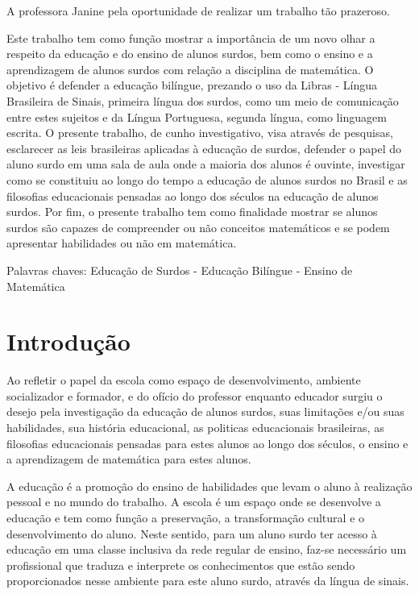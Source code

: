 \documentclass[brasil]{abnt}
\begin{document}
	A professora Janine pela oportunidade de realizar um trabalho tão prazeroso.

\begin{resumo}
	Este trabalho tem como função mostrar a importância de um novo olhar a respeito da educação e do ensino de alunos surdos, bem como o ensino e a aprendizagem de alunos surdos com
	relação a disciplina de matemática. O objetivo é defender a educação bilíngue, prezando o uso da Libras - Língua Brasileira de Sinais, primeira língua dos surdos, como um meio de comunicação entre estes sujeitos 
	e da Língua Portuguesa, segunda língua, como linguagem escrita. O presente trabalho, de cunho investigativo, visa através de pesquisas, esclarecer as leis brasileiras aplicadas à 
	educação  de surdos, defender o papel do aluno surdo em uma sala de aula onde a maioria dos alunos é ouvinte, investigar como se constituiu ao longo do tempo a educação de alunos 
	surdos no Brasil e as filosofias educacionais pensadas ao longo dos séculos na educação de alunos surdos. Por fim, o presente trabalho tem como finalidade mostrar se alunos surdos
	são capazes de compreender ou não conceitos matemáticos e se podem apresentar habilidades ou não em matemática.   
	
	Palavras chaves: Educação de Surdos - Educação Bilíngue - Ensino de Matemática  

\end{resumo}

\chapter*{Introdução}
	
	Ao refletir o papel da escola como  espaço de desenvolvimento, ambiente socializador e formador, e do ofício do professor enquanto educador surgiu o desejo pela investigação
	da educação de alunos surdos, suas limitações e/ou suas habilidades, sua história educacional, as politicas educacionais brasileiras, as filosofias educacionais pensadas para estes alunos
	ao longo dos séculos, o ensino e a aprendizagem de matemática para estes alunos.  
		
	A educação é a promoção do ensino de habilidades que levam o aluno à realização pessoal e no mundo do trabalho. 
	A escola é um espaço onde se desenvolve a educação e tem como função a preservação, a transformação cultural e o desenvolvimento do aluno. 
	Neste sentido, para um aluno surdo ter acesso à educação em uma classe inclusiva da rede regular de ensino, faz-se necessário um profissional que traduza e interprete os conhecimentos que 
	estão sendo proporcionados nesse ambiente para este aluno surdo, através da língua de sinais.
	
\end{document}
